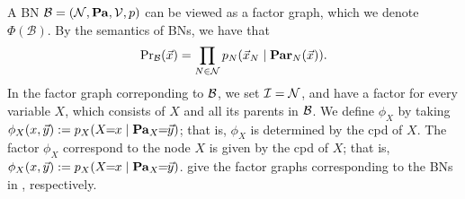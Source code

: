 {%
A BN $\mathcal B = (\mathcal N, \mathbf{Pa}, \mathcal V, p)$ can be viewed
as a factor graph, which we denote $\Phi(\mathcal B)$.
By the semantics of BNs, we have that
\begin{align*}
  {\Pr}_{\cal B}(\vec x) = \prod_{N \in \mathcal N} p_N( \vec x_N
	 \mid \mathbf{Par}_N(\vec x)). 
\end{align*} 
%
In the factor graph correponding to ${\cal B}$, 
we set $\cal I = \mathcal N$, and have a factor for every variable $X$, which
consists of $X$ and all its parents in ${\cal B}$.
We define $\phi_X$ by taking
$\phi_X(x, \vec{y}) := p_X( X \!\!=\!\! x \mid
\Pa_X \!\!=\!\! \vec y)$; that is, $\phi_X$ is determined by the cpd of $X$.
The factor $\phi_X$ correspond to the node $X$ is given by the cpd of
$X$; that is, $\phi_X(x,
\vec{y}) := p_X( X \!\!=\!\! x \mid 
\Pa_X \!\!=\!\! \vec y)$.
%
 give the factor graphs corresponding  to
the BNs in , respectively.  


}
